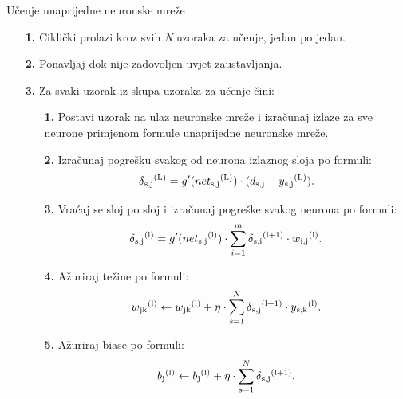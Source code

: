 \documentclass{beamer}
\begin{document}
        \begin{frame}{Učenje unaprijedne neuronske mreže}
            \begin{itemize}
                \begin{enumerate}
                    \item[\textbf{1.}] Ciklički prolazi kroz svih \textit{N} uzoraka za učenje, jedan po jedan.
                    \item[\textbf{2.}] Ponavljaj dok nije zadovoljen uvjet zaustavljanja.
                    \item[\textbf{3.}] Za svaki uzorak iz skupa uzoraka za učenje čini:
                    \begin{enumerate}
                        \item[\textbf{1.}] Postavi uzorak na ulaz neuronske mreže i izračunaj izlaze za sve neurone primjenom formule unaprijedne neuronske mreže.
                        \item[\textbf{2.}] Izračunaj pogrešku svakog od neurona izlaznog sloja po formuli: \[\delta\textsubscript{s,j}\textsuperscript{(L)} = g'(net\textsubscript{s,j}\textsuperscript{(L)})\cdot(d\textsubscript{s,j} - y\textsubscript{s,j}\textsuperscript{(L)}).\]
                        \item[\textbf{3.}] Vraćaj se sloj po sloj i izračunaj pogreške svakog neurona po formuli:
                        \[\delta\textsubscript{s,j}\textsuperscript{(l)} = g'(net\textsubscript{s,j}\textsuperscript{(l)})\cdot\sum\limits_{i=1}^m\delta\textsubscript{s,i}\textsuperscript{(l+1)}\cdot w\textsubscript{i,j}\textsuperscript{(l)}.\]
                        \item[\textbf{4.}] Ažuriraj težine po formuli:
                        \[w\textsubscript{jk}\textsuperscript{(l)} \leftarrow w\textsubscript{jk}\textsuperscript{(l)} + \eta\cdot\sum\limits_{s=1}^N \delta\textsubscript{s,j}\textsuperscript{(l+1)} \cdot y\textsubscript{s,k}\textsuperscript{(l)}.\]
                        \item[\textbf{5.}] Ažuriraj biase po formuli:
                        \[b\textsubscript{j}\textsuperscript{(l)} \leftarrow b\textsubscript{j}\textsuperscript{(l)} + \eta\cdot\sum\limits_{s=1}^N \delta\textsubscript{s,j}\textsuperscript{(l+1)}.\]
                    \end{enumerate}
                \end{enumerate}
            \end{itemize}
        \end{frame}
\end{document}
